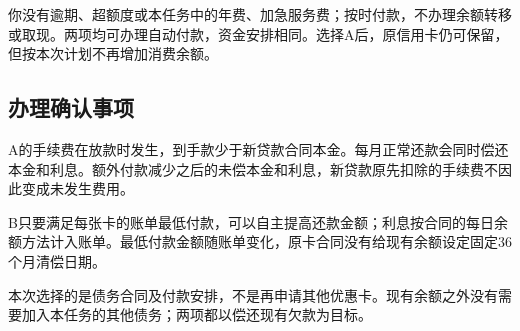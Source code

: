 \documentclass[UTF8,fontset=none,11pt,a4paper]{ctexart}
\begin{document}
你没有逾期、超额度或本任务中的年费、加急服务费；按时付款，不办理余额转移或取现。两项均可办理自动付款，资金安排相同。选择A后，原信用卡仍可保留，但按本次计划不再增加消费余额。


\subsection*{办理确认事项}
A的手续费在放款时发生，到手款少于新贷款合同本金。每月正常还款会同时偿还本金和利息。额外付款减少之后的未偿本金和利息，新贷款原先扣除的手续费不因此变成未发生费用。


B只要满足每张卡的账单最低付款，可以自主提高还款金额；利息按合同的每日余额方法计入账单。最低付款金额随账单变化，原卡合同没有给现有余额设定固定36个月清偿日期。


本次选择的是债务合同及付款安排，不是再申请其他优惠卡。现有余额之外没有需要加入本任务的其他债务；两项都以偿还现有欠款为目标。
\end{document}
